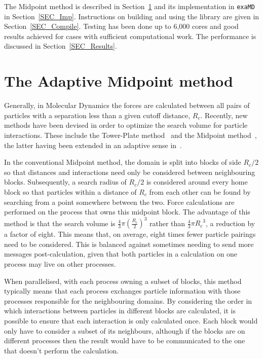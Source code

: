 \documentclass[paper=a4, fontsize=11pt,bibtotoc]{scrartcl}		%
\newcommand{\TT}[1]{\texttt{#1}}
\begin{document}
The Midpoint method is described in Section~\ref{SEC_Midpoint} and its implementation in \TT{exaMD} in Section~\ref{SEC_Imp}.
Instructions on building and using the library are given in Section~\ref{SEC_Compile}.
Testing has been done up to 6,000 cores and good results achieved for cases with sufficient computational work.  
The performance is discussed in Section~\ref{SEC_Results}. 


\section{The Adaptive Midpoint method} \label{SEC_Midpoint}

Generally, in Molecular Dynamics the forces are calculated between all pairs of particles with a separation less than a given cutoff distance, 
$R_c$. 
Recently, new methods have been devised in order to optimize the search volume for particle interactions. These include the Tower-Plate method~\cite{Larson08} 
and the Midpoint method~\cite{Bowers06}, the latter having been extended in an adaptive sense in~\cite{FSSM17}. 

In the conventional Midpoint method, the domain is split into blocks of side $R_c/2$ so that distances 
and interactions need only be considered between neighbouring blocks. Subsequently, a search radius of $R_c/2$ is considered around every home 
block so that particles within a 
distance of $R_c$ from each other can be found by searching from a point somewhere between the two. 
Force calculations are performed on the process that owns this midpoint block. The advantage of this method is that the search volume is $\frac{4}{3}\pi{(\frac{R_c}{2})}^3$ rather than 
$\frac{4}{3}\pi{R_c}^3$, a reduction by a factor of eight. This means that, on average, eight times fewer particle pairings need to be considered.  
This is balanced against sometimes needing to send more messages post-calculation, given that both particles in a calculation on one process may 
live on other processes.

When parallelised, with each process owning a subset of blocks, this method typically means that 
each process exchanges particle information with those processes responsible for the neighbouring domains. By considering the order in which 
interactions between particles in different blocks are calculated, it is possible to ensure that each interaction is only calculated once. Each 
block would only have to consider a subset of its neighbours, although if the blocks are on different processes then the result would have to be 
communicated to the one that doesn't perform the calculation. 
\end{document}
